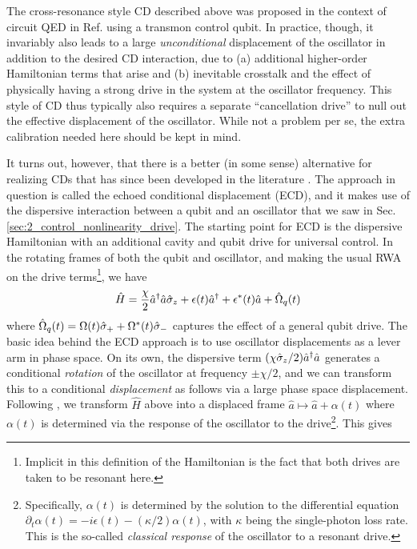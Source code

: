The cross-resonance style CD described above was proposed in the context of circuit QED in Ref. \cite{touzard2019gated} using a transmon control qubit. In practice, though, it invariably also leads to a large \textit{unconditional} displacement of the oscillator in addition to the desired CD interaction, due to (a) additional higher-order Hamiltonian terms that arise and (b) inevitable crosstalk and the effect of physically having a strong drive in the system at the oscillator frequency. This style of CD thus typically also requires a separate ``cancellation drive'' to null out the effective displacement of the oscillator. While not a problem per se, the extra calibration needed here should be kept in mind. 

It turns out, however, that there is a better (in some sense) alternative for realizing CDs that has since been developed in the literature \cite{campagne2020gkp-expt, eickbusch2022fast}. The approach in question is called the echoed conditional displacement (ECD), and it makes use of the dispersive interaction between a qubit and an oscillator that we saw in Sec. \ref{sec:2_control_nonlinearity_drive}. The starting point for ECD is the dispersive Hamiltonian with an additional cavity and qubit drive for universal control. In the rotating frames of both the qubit and oscillator, and making the usual RWA on the drive terms\footnote{Implicit in this definition of the Hamiltonian is the fact that both drives are taken to be resonant here.}, we have 
\begin{equation}
    \hat{H} = \frac{\chi}{2}\hat{a}^\dagger\hat{a}\hat{\sigma}_z + \epsilon(t)\hat{a}^\dagger + \epsilon^\ast(t)\hat{a} + \hat{\Omega}_q(t)
\end{equation}
where $\hat{\Omega}_q(t) = \Omega(t)\hat{\sigma}_+ + \Omega^\ast(t)\hat{\sigma}_-$ captures the effect of a general qubit drive. The basic idea behind the ECD approach is to use oscillator displacements as a lever arm in phase space. On its own, the dispersive term $(\chi\hat{\sigma}_z/2)\hat{a}^\dagger\hat{a}$ generates a conditional \textit{rotation} of the oscillator at frequency $\pm \chi/2$, and we can transform this to a conditional \textit{displacement} as follows via a large phase space displacement. Following \cite{eickbusch2022fast}, we transform $\hat{H}$ above into a displaced frame $\hat{a} \mapsto \hat{a} + \alpha(t)$ where $\alpha(t)$ is determined via the response of the oscillator to the drive\footnote{Specifically, $\alpha(t)$ is determined by the solution to the differential equation $\partial_t\alpha(t) = -i\epsilon(t) - (\kappa/2)\alpha(t)$, with $\kappa$ being the single-photon loss rate. This is the so-called \textit{classical response} of the oscillator to a resonant drive.}. This gives
